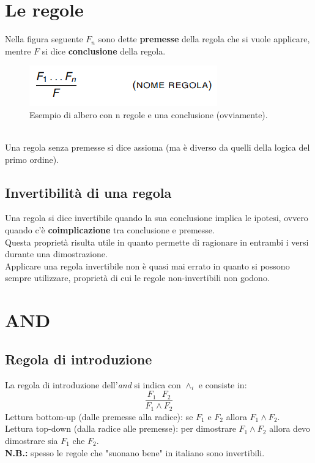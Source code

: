 \documentclass[12pt]{article}
\begin{document}
\section{Le regole}
Nella figura seguente $F_n$ sono dette \textbf{premesse} della regola che si vuole applicare, mentre $F$ si dice \textbf{conclusione} della regola.
\begin{figure}[!htb]
    \centering
    \includegraphics[width=.9\linewidth,height=.40\textheight,keepaspectratio]{brutta/regole_albero.png} %
    \begin{center}
        \caption{\label{fig:regole_albero}Esempio di albero con n regole e una conclusione (ovviamente).} %
    \end{center}
\end{figure}\\
Una regola senza premesse si dice assioma (ma è diverso da quelli della logica del primo ordine).
\subsection{Invertibilità di una regola}
Una regola si dice invertibile quando la sua conclusione implica le ipotesi, ovvero quando c'è \textbf{coimplicazione} tra conclusione e premesse.\\
Questa proprietà risulta utile in quanto permette di ragionare in entrambi i versi durante una dimostrazione.\\
Applicare una regola invertibile non è quasi mai errato in quanto si possono sempre utilizzare, proprietà di cui le regole non-invertibili non godono.
\section{AND}
\subsection{Regola di introduzione}
La regola di introduzione dell'\textit{and} si indica con $\wedge_i$ e consiste in:
\begin{equation}
    \dfrac{F_1 \text{ } F_2}{F_1 \wedge F_2} \label{rule:and_intro}
\end{equation}
Lettura bottom-up (dalle premesse alla radice): se $F_1$ e $F_2$ allora $F_1 \wedge F_2$.\\
Lettura top-down (dalla radice alle premesse): per dimostrare $F_1 \wedge F_2$ allora devo dimostrare sia $F_1$ che $F_2$.\\
\textbf{N.B.:} spesso le regole che "suonano bene" in italiano sono invertibili.
\end{document}
